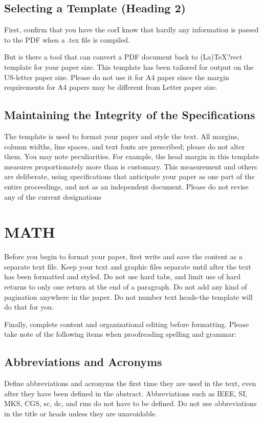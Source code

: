\documentclass[a4paper, 10pt, conference]{ieeeconf}
\begin{document}
\subsection{Selecting a Template (Heading 2)}

First, confirm that you have the corI know that hardly any information is passed to the PDF when a .tex file is compiled.

But is there a tool that can convert a PDF document back to (La)TeX?rect template for your paper size. This template has been tailored for output on the US-letter paper size. Please do not use it for A4 paper since the margin requirements for A4 papers may be different from Letter paper size.

\subsection{Maintaining the Integrity of the Specifications}

The template is used to format your paper and style the text. All margins, column widths, line spaces, and text fonts are prescribed; please do not alter them. You may note peculiarities. For example, the head margin in this template measures proportionately more than is customary. This measurement and others are deliberate, using specifications that anticipate your paper as one part of the entire proceedings, and not as an independent document. Please do not revise any of the current designations

\section{MATH}

Before you begin to format your paper, first write and save the content as a separate text file. Keep your text and graphic files separate until after the text has been formatted and styled. Do not use hard tabs, and limit use of hard returns to only one return at the end of a paragraph. Do not add any kind of pagination anywhere in the paper. Do not number text heads-the template will do that for you.

Finally, complete content and organizational editing before formatting. Please take note of the following items when proofreading spelling and grammar:

\subsection{Abbreviations and Acronyms} Define abbreviations and acronyms the first time they are used in the text, even after they have been defined in the abstract. Abbreviations such as IEEE, SI, MKS, CGS, sc, dc, and rms do not have to be defined. Do not use abbreviations in the title or heads unless they are unavoidable.
\end{document}
